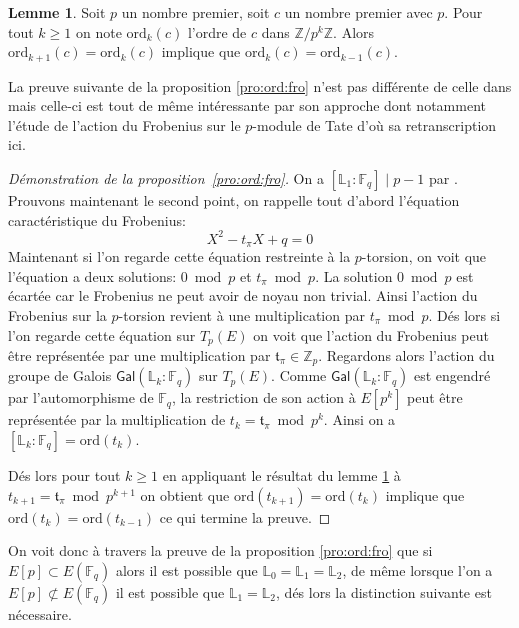 \documentclass[10pt,a4paper]{book}
\theoremstyle{plain}
\theoremstyle{definition}
\newtheorem{lem}[thm]{Lemme}
\theoremstyle{definition}
\theoremstyle{definition}
\theoremstyle{definition}
\theoremstyle{remark}
\theoremstyle{remark}
\theoremstyle{definition}
\begin{document}
\begin{lem}
\label{lem:ord}
Soit $p$ un nombre premier, soit $c$ un nombre premier avec $p$. Pour tout $k \geqslant 1$ on note $\mathrm{ord}_k(c)$ l'ordre de $c$ dans $\mathbb{Z}/p^k\mathbb{Z}$. Alors $\mathrm{ord}_{k+1}(c)=\mathrm{ord}_k(c)$ implique que $\mathrm{ord}_k(c) = \mathrm{ord}_{k-1}(c)$.
\end{lem}

La preuve suivante de la proposition \ref{pro:ord:fro} n'est pas différente de celle dans \cite[Proposition 5]{DeFeo11} mais celle-ci est tout de même intéressante par son approche dont notamment l'étude de l'action du Frobenius sur le $p$-module de Tate d'où sa retranscription ici.

\begin{proof}[Démonstration de la proposition~\ref{pro:ord:fro}]
On a $[\mathbb{L}_1:\mathbb{F}_q] \mid p-1$ par \cite[Theorem 4]{Gunji76}. Prouvons maintenant le second point,
on rappelle tout d'abord l'équation caractéristique du Frobenius:
\begin{equation*}
X^2 - t_{\pi}X + q = 0
\end{equation*}
Maintenant si l'on regarde cette équation restreinte à la $p$-torsion, on voit 
que l'équation a deux solutions: $0 \bmod p$ et $t_{\pi} \bmod p$. La solution 
$0 \bmod p$ est écartée car le Frobenius ne peut avoir de noyau non trivial. 
Ainsi l'action du Frobenius sur la $p$-torsion revient à une multiplication par
$t_{\pi} \bmod p$. Dés lors si l'on regarde cette équation sur $T_{p}(E)$ on 
voit que l'action du Frobenius peut être représentée par une multiplication par
$\mathfrak{t}_{\pi} \in \mathbb{Z}_{p} $. Regardons alors l'action du groupe de
Galois $\mathsf{Gal}(\mathbb{L}_k:\mathbb{F}_q)$ sur $T_{p}(E)$. Comme 
$\mathsf{Gal}(\mathbb{L}_k:\mathbb{F}_q)$ est engendré par l'automorphisme de 
$\mathbb{F}_q$, la restriction de son action à $E[p^k]$ peut être représentée 
par la multiplication de $t_k=\mathfrak{t}_{\pi}\bmod p^k$. Ainsi on a 
$[\mathbb{L}_k:\mathbb{F}_q]=\mathrm{ord}(t_k)$.

Dés lors pour tout $k\geqslant 1$ en appliquant le résultat du lemme \ref{lem:ord} à $t_{k+1}=\mathfrak{t}_{\pi} \bmod p^{k+1}$ on obtient que $\mathrm{ord}(t_{k+1})=\mathrm{ord}(t_{k})$ implique que $\mathrm{ord}(t_{k})=\mathrm{ord}(t_{k-1})$ ce qui termine la preuve.
\end{proof}

On voit donc à travers la preuve de la proposition \ref{pro:ord:fro} que si $E[p] \subset E(\mathbb{F}_q)$ alors il est possible que $\mathbb{L}_0=\mathbb{L}_1=\mathbb{L}_2$, de même lorsque l'on a $E[p] \not\subset E(\mathbb{F}_q)$ il est possible que $\mathbb{L}_1=\mathbb{L}_2$, dés lors la distinction suivante est nécessaire.
\end{document}
